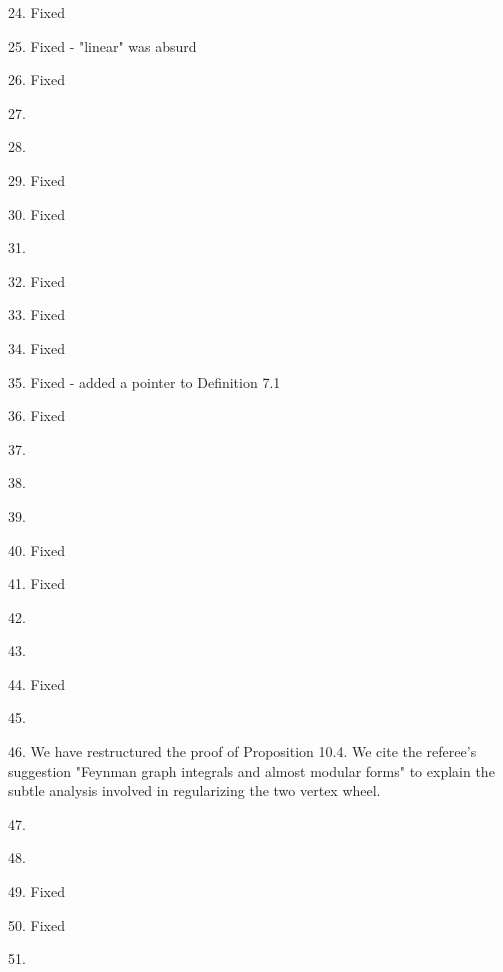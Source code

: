 \documentclass[10pt]{amsart}
\begin{document}
24. Fixed

25. Fixed - "linear" was absurd

26. Fixed

27.

28. 

29. Fixed

30. Fixed

31. 

32. Fixed

33. Fixed

34. Fixed

35. Fixed - added a pointer to Definition 7.1

36. Fixed

37.

38.

39.

40. Fixed

41. Fixed

42.

43. 

44. Fixed

45.

46. We have restructured the proof of Proposition 10.4.
We cite the referee's suggestion "Feynman graph integrals and almost modular forms" to explain the subtle analysis involved in regularizing the two vertex wheel.

47.

48.

49. Fixed

50. Fixed

51.
\end{document}
